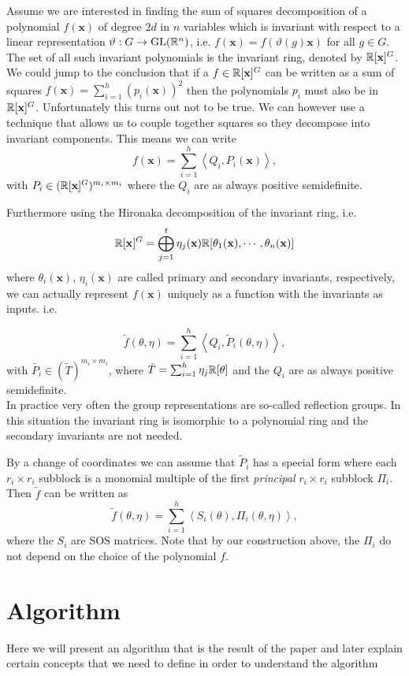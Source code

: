 \documentclass[]{article}
\begin{document}
Assume we are interested in finding the sum of squares decomposition of a polynomial $f(\textbf{x})$ of degree $2d$ in $n$
variables which is invariant with respect to a linear representation $\vartheta:G\rightarrow \mathrm{GL}(\mathbb R^n)$, i.e. $f(\textbf{x}) = f(\vartheta(g)\textbf{x})$ for all $g\in G$.
The set of all such invariant polynomials is the invariant ring, denoted by $\mathbb R[\textbf{x}]^G$. We could jump to the conclusion that if a $f\in \mathbb R[\textbf{x}]^G$ can be written as a 
sum of squares $f(\textbf{x}) =\sum_{i=1}^{h}(p_i(\textbf{x}))^2$ then the polynomials $p_i$ must also be in $\mathbb R[\mathbf{x}]^G$. Unfortunately this turns out not to be true. We can however
use a technique that allows us to couple together squares so they decompose into invariant components. This means we can write 
\[f(\textbf{x}) = \sum_{i=1}^{h}\left<Q_i,P_i(\mathbf{x})\right>,\]
with $P_i\in (\mathbb R[\mathbf{x}]^G)^{m_i\times m_i}$
where the $Q_i$ are as always positive semidefinite.


Furthermore using the Hironaka decomposition of the invariant ring, i.e.
\[\mathbb R[\mathbf{x}]^G = \bigoplus_{j=1}^{t}\eta_j(\textbf{x})\mathbb R[\theta_1(\textbf{x}), \cdots, \theta_n(\mathbf{x})]\] 
where $\theta_i(\mathbf{x})$, $\eta_i(\mathbf{x})$ are called primary and secondary invariants, respectively, 
we can actually represent $f(\mathbf{x})$ uniquely as a function with the invariants as inputs. i.e.

\[\tilde{f}(\theta,\eta) = \sum_{i=1}^{h}\left<Q_i,\tilde{P}_i(\theta,\eta)\right>,\] 
with $\tilde{P_i} \in (\tilde{T})^{m_i\times m_i}$, where $\tilde{T} = \sum_{i=1}^{h}\eta_j\mathbb R[\theta]$ and the $Q_i$ are as always positive semidefinite.\\
In practice very often the group representations are so-called reflection groups. In this situation the invariant ring is 
isomorphic to a polynomial ring and the secondary invariants are not needed.

By a change of coordinates we can assume that $\tilde{P}_i$ has a special form where each $r_i\times r_i$ subblock is a monomial multiple of the first \textit{principal} $r_i\times r_i$ subblock $\Pi_i$. Then $\tilde{f}$ can be written as 
\[
    \tilde{f}(\theta, \eta)=\sum_{i=1}^h\left<S_i(\theta),\Pi_i(\theta,\eta)\right>,
\]
where the $S_i$ are SOS matrices. %
Note that by our construction above, the $\Pi_i$ do not depend on the choice of the polynomial $f$.



\section{Algorithm}
Here we will present an algorithm that is the result of the paper and later explain certain concepts that we need to define in order to understand the algorithm
\end{document}
